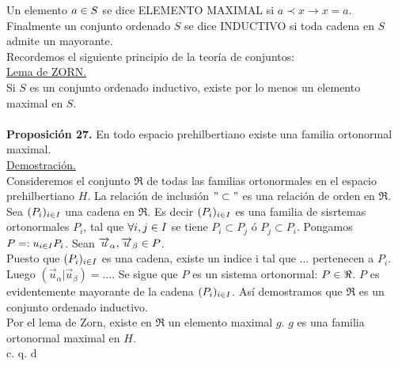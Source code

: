 Un elemento $a \in S$ se dice ELEMENTO MAXIMAL si $a \prec x \to x=a$. Finalmente un conjunto ordenado $S$ se dice INDUCTIVO si toda cadena en $S$ admite un mayorante. \\
Recordemos el siguiente principio de la teoría de conjuntos: \\
\underline{Lema de ZORN.} \\
Si $S$ es un conjunto ordenado inductivo, existe por lo menos un elemento maximal en $S$. \\ \\
\textbf{Proposición 27.}
En todo espacio prehilbertiano existe una familia ortonormal maximal. \\
\underline{Demostración.}\\
Consideremos el conjunto $\Re$ de todas las familias ortonormales en el espacio prehilbertiano $H$. La relación de inclusión $"\subset "$ es una relación de orden en $\Re$. \\
Sea $(P_i)_{i \in I}$ una cadena en $\Re$. Es decir $(P_i)_{i \in I}$ es una familia de sisrtemas ortonormales $P_i$, tal que $\forall i ,j \in I$ se tiene $P_i \subset P_j$ ó $P_j \subset P_i$. Pongamos $P=: u_{i \in I}P_i$. Sean $\overrightarrow{u}_\alpha,\overrightarrow{u}_\beta \in P$. \\
Puesto que $(P_i)_{i \in I}$ es una cadena, existe un indice i tal que ... pertenecen a $P_i$. Luego $(\overrightarrow{u}_\alpha | \overrightarrow{u}_\beta)=...$. Se sigue que $P$ es un sistema ortonormal: $P \in \Re$. $P$ es evidentemente mayorante de la cadena $(P_i)_{i \in I}$. Así demostramos que $\Re$ es un conjunto ordenado inductivo. \\
Por el lema de Zorn, existe en $\Re$ un elemento maximal $g$. $g$ es una familia ortonormal maximal en $H$. \\
 \phantom{sssssssssssssssssssssssssssssssssss sasdasdasdasdadadssada} c. q. d \\ \\
 

